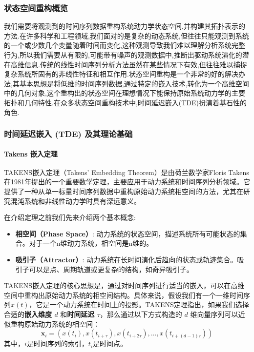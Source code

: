 \subsubsection{状态空间重构概览} %
我们需要将观测到的时间序列数据重构系统动力学状态空间,并构建其拓扑表示的方法.在许多科学和工程领域,我们面对的是复杂的动态系统,但往往只能观测到系统的一个或少数几个变量随着时间而变化,这种观测导致我们难以理解分析系统完整行为,所以我们需要从有限的,可能带有噪声的观测数据中,推断出驱动系统演化的潜在高维信息.传统的线性时间序列分析方法虽然在某些情况下有效,但往往难以捕捉复杂系统所固有的非线性特征和相互作用.状态空间重构是一个非常的好的解决办法,其基本思想是将低维的时间序列数据,通过特定的嵌入技术,转化为一个高维空间中的几何对象,这个重构出的状态空间在理想情况下能保持原始系统动力学的主要拓扑和几何特性.在众多状态空间重构技术中,时间延迟嵌入(TDE)扮演着基石性的角色.

\subsubsection{时间延迟嵌入 (TDE) 及其理论基础}
\paragraph{Takens 嵌入定理} %
TAKENS嵌入定理（Takens' Embedding Theorem）\cite{takens2006detecting}是由荷兰数学家Floris Takens在1981年提出的一个重要数学定理，主要应用于动力系统和时间序列分析领域。它提供了一种从单一标量时间序列数据中重构原始动力系统相空间的方法，尤其在研究混沌系统和非线性动力学时具有深远意义。

在介绍定理之前我们先来介绍两个基本概念:
\begin{itemize}
    \item \textbf{相空间（Phase Space）}: 动力系统的状态空间，描述系统所有可能状态的集合。对于一个n维动力系统，相空间是n维的。
    \item \textbf{吸引子（Attractor）}: 动力系统在长时间演化后趋向的状态或轨迹集合。吸引子可以是点、周期轨道或更复杂的结构，如奇异吸引子。
\end{itemize}
TAKENS嵌入定理的核心思想是，通过对时间序列进行适当的嵌入，可以在高维空间中重构出原始动力系统的相空间结构。具体来说，假设我们有一个一维时间序列$x(t)$，它是一个动力系统在时间上的投影。TAKENS定理指出，如果我们选择合适的\textbf{嵌入维度 $d$} 和\textbf{时间延迟 $\tau$}，那么通过以下方式构造的 $d$ 维向量序列可以近似重构原始动力系统的相空间：
\begin{equation}
    \mathbf{x}_i = (x(t_i), x(t_{i+\tau}), x(t_{i+2\tau}), \ldots, x(t_{i+(d-1)\tau}))
\end{equation}
其中，$i$是时间序列的索引，$t_i$是时间点。

